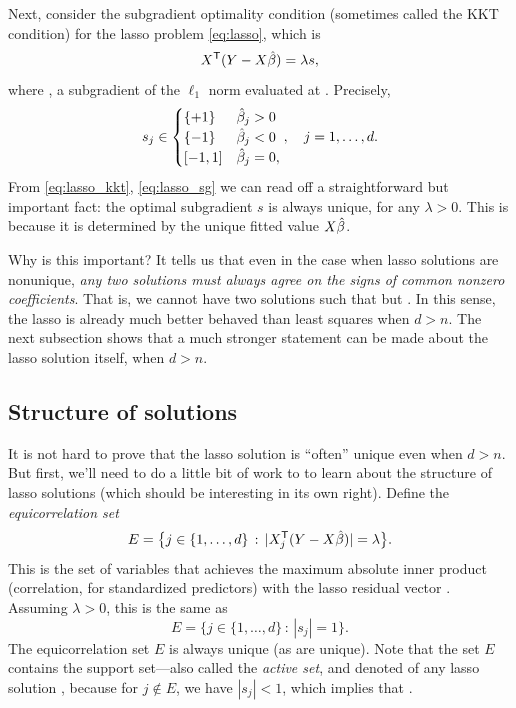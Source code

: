 \documentclass{article}
\begin{document}
Next, consider the subgradient optimality condition (sometimes called the KKT 
condition) for the lasso problem \eqref{eq:lasso}, which is
\begin{equation}
\label{eq:lasso_kkt}
X^{\mathsf{T}} (Y - X\hat{\beta}) = \lambda s,
\end{equation}
where , a subgradient of the $\ell_1$ norm
evaluated at \smash{$\hbeta$}. Precisely, 
\begin{equation}
\label{eq:lasso_sg}
s_j \in \begin{cases} 
\{+1\} & \hat{\beta}_j > 0 \\
\{-1\} & \hat{\beta}_j < 0 \\
[-1,1] & \hat{\beta}_j = 0,
\end{cases}, \quad j=1,\dots,d.
\end{equation}
From \eqref{eq:lasso_kkt}, \eqref{eq:lasso_sg} we can read off a straightforward
but important fact: the optimal subgradient $s$ is always unique, for any
$\lambda>0$. This is because it is determined by the unique fitted value
$X\hat{\beta}$.    

Why is this important? It tells us that even in the case when lasso solutions
are nonunique, \emph{any two solutions must always agree on the signs of common
  nonzero coefficients}. That is, we cannot have two solutions \smash{$\hbeta,
  \tilde\beta$} such that  but . In this sense, the lasso is already much better behaved than least
squares when $d>n$. The next subsection shows that a much stronger statement 
can be made about the lasso solution itself, when $d > n$.     

\subsection{Structure of solutions}

It is not hard to prove that the lasso solution is ``often'' unique even when $d
> n$. But first, we'll need to do a little bit of work to to learn about the
structure of lasso solutions (which should be interesting in its own right). 
Define the \emph{equicorrelation set}   
\[
E = \big\{ j \in \{1,\dots,d\} \,:\, |X_j^{\mathsf{T}} (Y - X\hat{\beta})| = \lambda \big\}.   
\]
This is the set of variables that achieves the maximum absolute inner product
(correlation, for standardized predictors) with the lasso residual vector
. Assuming $\lambda>0$, this is the same as 
\[
E = \big\{ j \in \{1,\dots,d\} \,:\, |s_j| = 1 \big\}. 
\]
The equicorrelation set $E$ is always unique (as  are
unique). Note that the set $E$ contains the support set---also called the
\emph{active set}, and denoted  of any lasso solution 
\smash{$\hbeta$}, because for $j \notin E$, we have $|s_j| < 1$, which implies
that  .   
\end{document}
